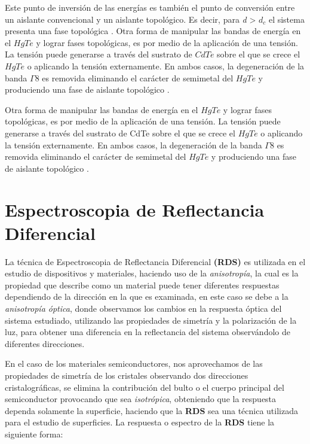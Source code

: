 Este punto de inversión de las energías es también el punto de conversión entre un aislante convencional y un aislante 
topológico. Es decir, para \textit{d} > $ d_{c} $ el sistema presenta una fase topológica \cite{Bernevig2006}. 
Otra forma de manipular las bandas de energía en el $ HgTe $ y lograr fases topológicas, es por medio de la aplicación de 
una tensión. La tensión puede generarse a través del sustrato de $ CdTe $ sobre el que se crece el $ HgTe $ o aplicando 
la tensión externamente. En ambos casos, la degeneración de la banda $ \Gamma{8} $ es removida eliminando el carácter de 
semimetal del $ HgTe $ y produciendo una fase de aislante topológico \cite{Brne2011}\cite{Wu2014}. 

Otra forma de manipular las bandas de energía en el $ HgTe $ y lograr fases topológicas, es por medio de la aplicación de 
una tensión. La tensión puede generarse a través del sustrato de CdTe sobre el que se crece el $ HgTe $ o aplicando la 
tensión externamente. En ambos casos, la degeneración de la banda  $ \Gamma{8} $ es removida eliminando el carácter de 
semimetal del $ HgTe $ y produciendo una fase de aislante topológico \cite{Brne2011}\cite{Wu2014}. 

\section{Espectroscopia de Reflectancia Diferencial}
\label{sec:chap3-rds}
La técnica de Espectroscopia de Reflectancia Diferencial \textbf{(RDS)} es utilizada en el estudio 
de dispositivos y materiales, haciendo uso de la \textit{anisotropía}, la cual es la propiedad que 
describe como un material puede tener diferentes respuestas dependiendo de la dirección en la que es examinada, 
en este caso se debe a la \textit{anisotropía óptica}, donde observamos los cambios en la respuesta óptica 
del sistema estudiado, utilizando las propiedades de simetría y la polarización de la luz, para obtener 
una diferencia en la reflectancia del sistema observándolo de diferentes direcciones.

En el caso de los materiales semiconductores, nos aprovechamos de las propiedades
de simetría de los cristales observando dos direcciones cristalográficas, se elimina
la contribución del bulto o el cuerpo principal del semiconductor provocando que sea \textit{isotrópica}, 
obteniendo que la respuesta dependa solamente la superficie, haciendo que la \textbf{RDS} sea una 
técnica utilizada para el estudio de superficies.\cite{Aspnes1985} La respuesta o espectro de la 
\textbf{RDS} tiene la siguiente forma:

